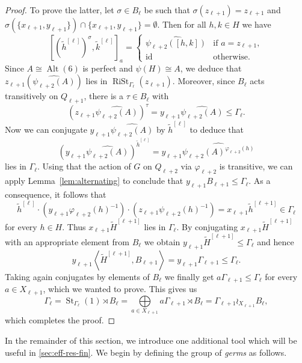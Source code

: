 \documentclass[a4paper]{amsart}
\renewcommand\leq\leqslant
\numberwithin{equation}{section}
\theoremstyle{definition}
\theoremstyle{remark}
\DeclareMathOperator{\Alt}{Alt}
\DeclareMathOperator{\id}{id}
\DeclareMathOperator{\RiSt}{RiSt}
\DeclareMathOperator{\St}{St}
\begin{document}
\begin{proof}
To prove the latter, let $\sigma \in B_{\ell}$ be such that $\sigma(z_{\ell+1}) = z_{\ell+1}$ and $\sigma(\{x_{\ell+1},y_{\ell+1}\}) \cap \{x_{\ell+1},y_{\ell+1}\} = \emptyset$.
Then for all $h,k \in H$ we have
\[
[(\widetilde{h}^{[\ell]})^{\sigma},\widetilde{k}^{[\ell]}]_a = 
\begin{cases}
        \widehat{\psi_{\ell+2}([h,k])} &
        \text{if } a = z_{\ell+1},\\[3pt]
        \id &
        \text{otherwise}.
\end{cases}
\]
Since $A \cong \Alt(6)$ is perfect and $\psi(H) \cong A$, we deduce that $z_{\ell+1}(\widehat{\psi_{\ell+2}(A)})$ lies in $\RiSt_{\Gamma_{\ell}}(z_{\ell+1})$.
Moreover, since $B_{\ell}$ acts transitively on $Q_{\ell+1}$, there is a $\tau \in B_{\ell}$ with
\[
(z_{\ell+1}\widehat{\psi_{\ell+2}(A)})^{\tau} = y_{\ell+1}\widehat{\psi_{\ell+2}(A)} \leq \Gamma_{\ell}.
\]
Now we can conjugate $y_{\ell+1}\widehat{\psi_{\ell+2}(A)}$ by $\widetilde{h}^{[\ell]}$ to deduce that
\[
\left(y_{\ell+1}\widehat{\psi_{\ell+2}(A)}\right)^{\widetilde{h}^{[\ell]}}
= y_{\ell+1}\widehat{\psi_{\ell+2}(A)^{\varphi_{\ell+2}(h)}}
\]
lies in $\Gamma_{\ell}$.
Using that the action of $G$ on $Q_{\ell+2}$ via $\varphi_{\ell+2}$ is transitive, we can apply Lemma~\ref{lem:alternating} to conclude that $y_{\ell+1}B_{\ell+1} \leq \Gamma_{\ell}$.
As a consequence, it follows that
\[
\widetilde{h}^{[\ell]}
\cdot \left(y_{\ell+1}\varphi_{\ell+2}(h)^{-1}\right)
\cdot \left(z_{\ell+1}\psi_{\ell+2}(h)^{-1}\right)
= x_{\ell+1} \widetilde{h}^{[\ell+1]} \in \Gamma_{\ell}
\]
for every $h \in H$.
Thus $x_{\ell+1} \widetilde{H}^{[\ell+1]}$ lies in $\Gamma_{\ell}$.
By conjugating $x_{\ell+1} \widetilde{H}^{[\ell+1]}$ with an appropriate element from $B_{\ell}$ we obtain $y_{\ell+1} \widetilde{H}^{[\ell+1]} \leq \Gamma_{\ell}$ and hence
\[
y_{\ell+1} \left\langle \widetilde{H}^{[\ell+1]},B_{\ell+1} \right\rangle
= y_{\ell+1} \Gamma_{\ell+1}
\leq \Gamma_{\ell}.
\]
Taking again conjugates by elements of $B_{\ell}$ we finally get $a \Gamma_{\ell+1} \leq \Gamma_{\ell}$ for every $a \in X_{\ell+1}$, which we wanted to prove.
This gives us
\[
\Gamma_{\ell}
= \St_{\Gamma_{\ell}}(1) \rtimes B_{\ell}
= \bigoplus \limits_{a \in X_{\ell+1}} a\Gamma_{\ell+1} \rtimes B_{\ell}
= \Gamma_{\ell+1} \wr_{X_{\ell+1}} B_{\ell},
\]
which completes the proof.
\end{proof}

In the remainder of this section, we introduce one additional tool which will be useful in \cref{sec:eff-res-fin}.
We begin by defining the group of \emph{germs} as follows.
\end{document}
